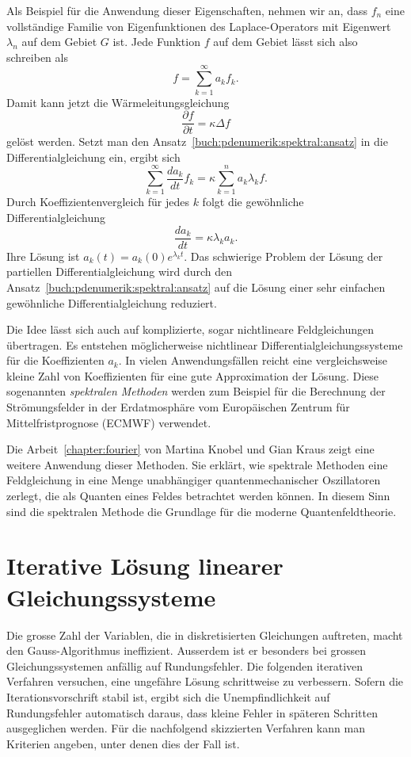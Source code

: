 Als Beispiel für die Anwendung dieser Eigenschaften, nehmen wir an,
dass $f_n$ eine vollständige Familie von Eigenfunktionen des Laplace-Operators
mit Eigenwert $\lambda_n$ auf dem Gebiet $G$ ist. 
Jede Funktion $f$ auf dem Gebiet lässt sich also schreiben als
\begin{equation}
f = \sum_{k=1}^\infty a_k f_k.
\label{buch:pdenumerik:spektral:ansatz}
\end{equation}
Damit kann jetzt die Wärmeleitungsgleichung
\[
\frac{\partial f}{\partial t}
=
\kappa
\Delta f
\]
gelöst werden.
Setzt man den Ansatz~\eqref{buch:pdenumerik:spektral:ansatz} in die 
Differentialgleichung ein, ergibt sich
\[
\sum_{k=1}^\infty
\frac{d a_k}{d t}
f_k
=
\kappa \sum_{k=1}^n a_k \lambda_k f.
\]
Durch Koeffizientenvergleich für jedes $k$ folgt die gewöhnliche
Differentialgleichung
\[
\frac{d a_k}{d t}
=
\kappa \lambda_k a_k.
\]
Ihre Lösung ist $a_k(t) = a_k(0) e^{\lambda_kt}$.
Das schwierige Problem der Lösung der partiellen Differentialgleichung
wird durch den Ansatz~\eqref{buch:pdenumerik:spektral:ansatz} auf die
Lösung einer sehr einfachen gewöhnliche Differentialgleichung reduziert.

Die Idee lässt sich auch auf komplizierte, sogar nichtlineare
Feldgleichungen übertragen.
Es entstehen möglicherweise nichtlinear Differentialgleichungssysteme
für die Koeffizienten $a_k$.
In vielen Anwendungsfällen reicht eine vergleichsweise kleine Zahl
von Koeffizienten für eine gute Approximation der Lösung.
Diese sogenannten \emph{spektralen Methoden}
%
werden zum Beispiel für die Berechnung der Strömungsfelder in der 
Erdatmosphäre vom Europäischen Zentrum für Mittelfristprognose
(ECMWF) verwendet.

Die Arbeit~\ref{chapter:fourier} von Martina Knobel und Gian Kraus
zeigt eine weitere Anwendung dieser Methoden.
Sie erklärt, wie spektrale Methoden eine Feldgleichung in eine Menge
unabhängiger quantenmechanischer Oszillatoren zerlegt, die als Quanten
eines Feldes betrachtet werden können.
In diesem Sinn sind die spektralen Methode die Grundlage für die
moderne Quantenfeldtheorie.

%
%
\section{Iterative Lösung linearer Gleichungssysteme
\label{buch:pdenumerik:section:linear}}
Die grosse Zahl der Variablen, die in diskretisierten Gleichungen auftreten,
macht den Gauss-Algorithmus ineffizient.
Ausserdem ist er besonders bei grossen Gleichungssystemen anfällig auf
Rundungsfehler.
Die folgenden iterativen Verfahren versuchen, eine ungefähre Lösung
schrittweise zu verbessern.
Sofern die Iterationsvorschrift stabil ist, ergibt sich die Unempfindlichkeit
auf Rundungsfehler automatisch daraus, dass kleine Fehler in späteren
Schritten ausgeglichen werden.
Für die nachfolgend skizzierten Verfahren kann man Kriterien angeben,
unter denen dies der Fall ist.

